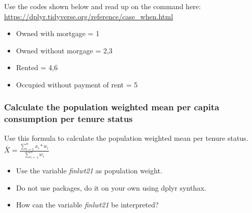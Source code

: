 \documentclass[
]{article}
\providecommand{\tightlist}{%
  \setlength{\itemsep}{0pt}\setlength{\parskip}{0pt}}
\begin{document}
Use the codes shown below and read up on the command here:
\url{https://dplyr.tidyverse.org/reference/case_when.html}

\begin{itemize}
\tightlist
\item
  Owned with mortgage = 1
\item
  Owned without morgage = 2,3
\item
  Rented = 4,6
\item
  Occupied without payment of rent = 5
\end{itemize}

\hypertarget{calculate-the-population-weighted-mean-per-capita-consumption-per-tenure-status}{%
\subsubsection{Calculate the population weighted mean per capita
consumption per tenure
status}\label{calculate-the-population-weighted-mean-per-capita-consumption-per-tenure-status}}

Use this formula to calculate the population weighted mean per tenure
status.
\(\bar{X} = \frac{\sum^{n}_{i=1} {x_i * w_i}}{\sum^{n}_{i=1} {w_i}}\)

\begin{itemize}
\tightlist
\item
  Use the variable \emph{finlwt21} as population weight.
\item
  Do not use packages, do it on your own using dplyr synthax.
\item
  How can the variable \emph{finlwt21} be interpreted?
\end{itemize}
\end{document}
